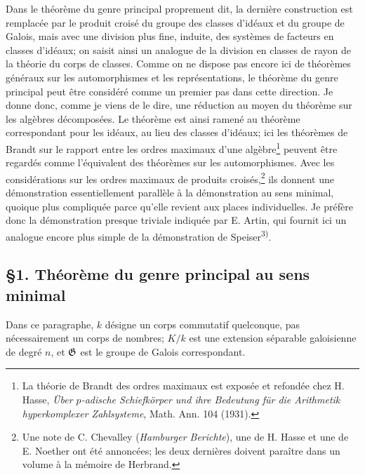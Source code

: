 Dans le théorème du genre principal proprement dit, la dernière construction est remplacée par le produit croisé du groupe des classes d'idéaux et du groupe de Galois, mais avec une division plus fine, induite, des systèmes de facteurs en classes d'idéaux; on saisit ainsi un analogue de la division en classes de rayon de la théorie du corps de classes. Comme on ne dispose pas encore ici de théorèmes généraux sur les automorphismes et les représentations, le théorème du genre principal peut être considéré comme un premier pas dans cette direction. Je donne donc, comme je viens de le dire, une réduction au moyen du théorème sur les algèbres décomposées. Le théorème est ainsi ramené au théorème correspondant pour les idéaux, au lieu des classes d'idéaux; ici les théorèmes de Brandt sur le rapport entre les ordres maximaux d'une algèbre\footnote{La théorie de Brandt des ordres maximaux est exposée et refondée chez H. Hasse, \emph{Über \(p\)-adische Schiefkörper und ihre Bedeutung für die Arithmetik hyperkomplexer Zahlsysteme}, Math. Ann. 104 (1931).} peuvent être regardés comme l'équivalent des théorèmes sur les automorphismes. Avec les considérations sur les ordres maximaux de produits croisés,\footnote{Une note de C. Chevalley (\emph{Hamburger Berichte}), une de H. Hasse et une de E. Noether ont été annoncées; les deux dernières doivent paraître dans un volume à la mémoire de Herbrand.} ils donnent une démonstration essentiellement parallèle à la démonstration au sens minimal, quoique plus compliquée parce qu'elle revient aux places individuelles. Je préfère donc la démonstration presque triviale indiquée par E. Artin, qui fournit ici un analogue encore plus simple de la démonstration de Speiser\textsuperscript{3)}.

\subsection*{\S{}1. Théorème du genre principal au sens minimal}

Dans ce paragraphe, \(k\) désigne un corps commutatif quelconque, pas nécessairement un corps de nombres; \(K/k\) est une extension séparable galoisienne de degré \(n\), et \(\mathfrak G\) est le groupe de Galois correspondant.

